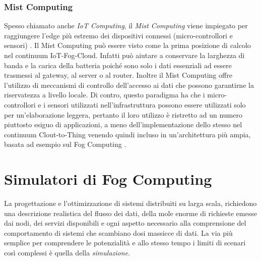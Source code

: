 
\subsubsection{Mist Computing}

Spesso chiamato anche \textit{IoT Computing}, il \textit{Mist Computing} viene impiegato per raggiungere l'edge più estremo dei dispositivi connessi (micro-controllori e sensori) \cite{MistComputing}. Il Mist Computing può essere visto come la prima posizione di calcolo nel continuum IoT-Fog-Cloud. Infatti può aiutare a conservare la larghezza di banda e la carica della batteria poiché sono solo i dati essenziali ad essere trasmessi al gateway, al server o al router. Inoltre il Mist Computing offre l'utilizzo di meccanismi di controllo dell'accesso ai dati che possono garantirne la riservatezza a livello locale. Di contro, questo paradigma ha che i micro-controllori e i sensori utilizzati nell'infrastruttura possono essere utilizzati solo per un'elaborazione leggera, pertanto il loro utilizzo è ristretto ad un numero piuttosto esiguo di applicazioni, a meno dell'implementazione dello stesso nel continuum Clout-to-Thing venendo quindi incluso in un'architettura più ampia, basata ad esempio sul Fog Computing \cite{MistComputingFutureDirections}.

\section{Simulatori di Fog Computing}

La progettazione e l'ottimizzazione di sistemi distribuiti su larga scala, richiedono una descrizione realistica del flusso dei dati, della mole enorme di richieste emesse dai nodi, dei servizi disponibili e ogni aspetto necessario alla comprensione del comportamento di sistemi che scambiano dosi massicce di dati. La via più semplice per comprendere le potenzialità e allo stesso tempo i limiti di scenari così complessi è quella della \textit{simulazione}.

